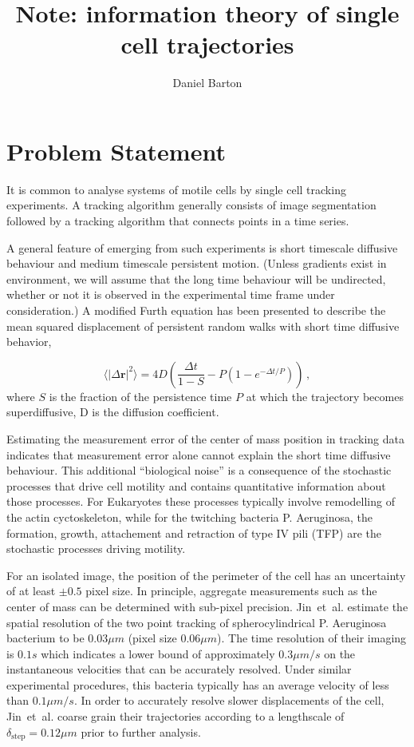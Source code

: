 \documentclass{article}
\title{Note: information theory of single cell trajectories}
\author{Daniel Barton}
\newcommand{\vct}[1]{\bm{#1}} %
\begin{document}
\maketitle


\newcommand{\dstep}{\ensuremath{\delta_{\text{step}}}}


\section{Problem Statement}

It is common to analyse systems of motile cells by single cell tracking experiments.
A tracking algorithm generally consists of image segmentation 
followed by a tracking algorithm that connects
points in a time series.

A general feature of emerging from such experiments is short timescale diffusive
behaviour and medium timescale persistent motion. (Unless gradients exist in
environment, we will assume that the long time behaviour will be undirected,
whether or not it is observed in the experimental time frame under consideration.)
A modified Furth equation has been presented to describe the mean squared displacement
of persistent random walks with short time diffusive behavior\cite{thomas2018instantaneous},

\begin{equation}
    \langle| \Delta\vct{r}|^2\rangle 
    = 4D\left( \frac{\Delta t}{1 - S} - P(1 - e^{-\Delta t/P}) \right) \, ,
\end{equation}
where $S$  is the fraction of the persistence time $P$ at which
the trajectory becomes superdiffusive, D is the diffusion coefficient.


Estimating the measurement error of the center of mass position in tracking 
data indicates that measurement error alone cannot explain the short time
diffusive behaviour\cite{thomas2018instantaneous}. This additional 
``biological noise'' is a consequence of the stochastic processes that 
drive cell motility and contains quantitative information about those processes.
For Eukaryotes these processes typically involve remodelling of the
actin cyctoskeleton, while for the twitching bacteria P. Aeruginosa, 
the formation, growth, attachement and retraction of type IV pili (TFP) are the 
stochastic processes driving motility.

For an isolated image, the position of the perimeter of the cell has 
an uncertainty of at least $\pm 0.5$ pixel size. In principle, 
aggregate measurements such as the center of mass can be determined with
sub-pixel precision. Jin~et~al. estimate the spatial resolution
of the two point tracking of spherocylindrical P. Aeruginosa bacterium to be
$0.03 \mu m$ (pixel size $0.06\mu m$)\cite{jin2011bacteria}. 
The time resolution of their imaging is $0.1s$ which indicates a lower bound
of approximately $0.3\mu m/s$ on the instantaneous velocities that can be accurately resolved. 
Under similar experimental procedures,
this bacteria typically has an average velocity of less than 
$0.1\mu m/s$\cite{ni2016bacteria}. In order to accurately resolve slower displacements
of the cell, Jin~et~al. coarse grain their trajectories according to a lengthscale 
of $\dstep = 0.12\mu m$ prior to further analysis.
\end{document}
